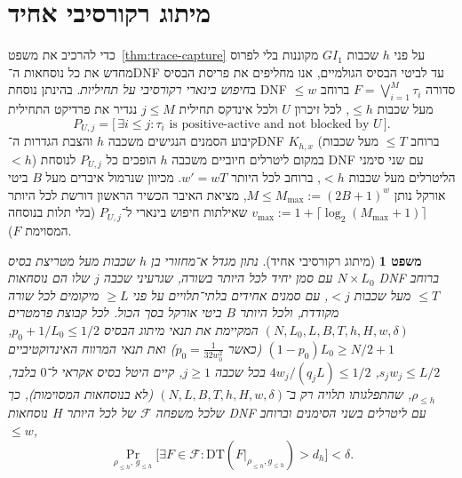 \documentclass[11pt,a4paper]{article}
\newtheorem{theorem}{משפט}[section]
\theoremstyle{definition}
\theoremstyle{remark}
\newcommand{\DT}{\mathrm{DT}}
\newcommand{\Prb}{\Pr}
\newcommand{\GI}{GI_1}
\newcommand{\EN}[1]{\textenglish{#1}}
\begin{document}
\section{מיתוג רקורסיבי אחיד}

כדי להרכיב את משפט~\ref{thm:trace-capture} על פני $h$ שכבות $\GI$ מקוננות בלי לפרוס מחדש את כל נוסחאות ה־\EN{DNF} עד לביטי הבסיס הגולמיים, אנו מחליפים את פריסת הבסיס ב\emph{חיפוש בינארי רקורסיבי על תחיליות}. בהינתן נוסחת \EN{DNF} סדורה $F = \bigvee_{i=1}^M \tau_i$ ברוחב $\le w$ מעל שכבות $\le h$, לכל זיכרון $U$ ולכל אינדקס תחילית $j \le M$ נגדיר את פרדיקט התחילית
\[
  P_{U,j} = \bigl[\,\exists i \le j : \tau_i \text{ is positive-active and not blocked by } U\,\bigr].
\]
קיבוע הסמנים הנגישים משכבה $h$ והצבת הגדרות ה־\EN{DNF} $K_{h,x}$ (ברוחב $\le T$ מעל שכבות $< h$) במקום ליטרלים חיוביים משכבה $h$ הופכים כל $P_{U,j}$ לנוסחת \EN{DNF} עם שני סימני הליטרלים מעל שכבות $< h$, ברוחב לכל היותר $w' = wT$. מכיוון שנרמול איברים מעל $B$ ביטי אורקל נותן $M \le M_{\max} := (2B+1)^w$, מציאת האיבר הכשיר הראשון דורשת לכל היותר $v_{\max} := 1 + \lceil \log_2(M_{\max}+1) \rceil$ שאילתות חיפוש בינארי ל־$P_{U,j}$ (בלי תלות בנוסחה המסוימת $F$).

\begin{theorem}[מיתוג רקורסיבי אחיד]
\label{thm:recursive-switching}
נתון מגדל א־מחזורי בן $h$ שכבות מעל מטריצת בסיס $N \times L_0$ עם סמן יחיד לכל היותר בשורה, שגרעיני שכבה $j$ שלו הם נוסחאות \EN{DNF} ברוחב $\le T$ מעל שכבות $< j$, עם סמנים אחידים בלתי־תלויים על פני $\ge L$ מיקומים לכל שורה מקודדת, ולכל היותר $B$ ביטי אורקל בסך הכול. לכל קבוצת פרמטרים $(N, L_0, L, B, T, h, H, w, \delta)$ המקיימת את תנאי מיתוג הבסיס $p_0 + 1/L_0 \le 1/2$, $(1-p_0)L_0 \ge N/2 + 1$ (כאשר $p_0 = \frac{1}{32 w_0^2}$) ואת תנאי המרווח האינדוקטיביים $s_j w_j \le L/2$, $4w_j/(q_j L) \le 1/2$ בכל שכבה $j \ge 1$, קיים היטל בסיס אקראי ל־$0$ בלבד, $\rho_{\le h}$, שהתפלגותו תלויה \emph{רק} ב־$(N, L, B, T, h, H, w, \delta)$ (לא בנוסחאות המסוימות), כך שלכל משפחה $\mathcal{F}$ של לכל היותר $H$ נוסחאות \EN{DNF} עם ליטרלים בשני הסימנים וברוחב $\le w$,
\[
  \Prb_{\rho_{\le h},\, g_{\le h}}\bigl[\exists F \in \mathcal{F} : \DT(F|_{\rho_{\le h}, g_{\le h}}) > d_h\bigr] < \delta.
\]
\end{theorem}
\end{document}
